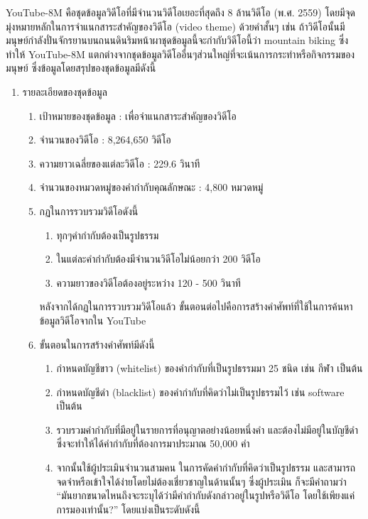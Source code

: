 YouTube-8M คือชุดข้อมูลวิดีโอที่มีจำนวนวิดีโอเยอะที่สุดถึง 8 ล้านวิดีโอ (พ.ศ. 2559) โดยมีจุดมุ่งหมายหลักในการจำแนกสาระสำคัญของวิดีโอ (video theme) 
ด้วยคำสั้นๆ เช่น ถ้าวิดีโอนั้นมีมนุษย์กำลังปั่นจักรยานบนถนนดินริมหน้าผาชุดข้อมูลนี้จะกำกับวิดีโอนี้ว่า mountain biking ซึ่งทำให้ YouTube-8M 
แตกต่างจากชุดข้อมูลวิดีโออื่นๆส่วนใหญ่ที่จะเน้นการกระทำหรือกิจกรรมของมนุษย์ ซึ่งข้อมูลโดยสรุปของชุดข้อมูลมีดังนี้
\begin{enumerate}
	\item {รายละเอียดของชุดข้อมูล}
	\begin{enumerate}
		\setlength\itemsep{-0.25em}
		\item เป้าหมายของชุดข้อมูล : เพื่อจำแนกสาระสำคัญของวิดีโอ
		\item จำนวนของวิดีโอ : 8,264,650 วิดีโอ
		\item ความยาวเฉลี่ยของแต่ละวิดีโอ : 229.6 วินาที
		\item จำนวนของหมวดหมู่ของคำกำกับคุณลักษณะ : 4,800 หมวดหมู่
		\item กฏในการรวบรวมวิดีโอดังนี้
		\begin{enumerate}
			\setlength\itemsep{-0.25em}
			\item ทุกๆคำกำกับต้องเป็นรูปธรรม
			\item ในแต่ละคำกำกับต้องมีจำนวนวิดีโอไม่น้อยกว่า 200 วิดีโอ
			\item ความยาวของวิดีโอต้องอยู่ระหว่าง 120 - 500 วินาที
		\end{enumerate}
		หลังจากได้กฏในการรวบรวมวิดีโอแล้ว ขั้นตอนต่อไปคือการสร้างคำศัพท์ที่ใช้ในการค้นหาข้อมูลวิดีโอจากใน YouTube 
		\item ขั้นตอนในการสร้างคำศัพท์มีดังนี้
		\begin{enumerate}
			\setlength\itemsep{-0.25em}
			\item กำหนดบัญชีขาว (whitelist) ของคำกำกับที่เป็นรูปธรรมมา 25 ชนิด เช่น กีฬา เป็นต้น
			\item กำหนดบัญชีดำ (blacklist) ของคำกำกับที่คิดว่าไม่เป็นรูปธรรมไว้ เช่น software เป็นต้น
			\item รวบรวมคำกำกับที่มีอยู่ในรายการที่อนุญาตอย่างน้อยหนึ่งคำ และต้องไม่มีอยู่ในบัญชีดำ ซึ่งจะทำให้ได้คำกำกับที่ต้องการมาประมาณ 50,000 คำ
			\item จากนั้นใช้ผู้ประเมินจำนวนสามคน ในการคัดคำกำกับที่คิดว่าเป็นรูปธรรม และสามารถจดจำหรือเข้าใจได้ง่ายโดยไม่ต้องเชี่ยวชาญในด้านนั้นๆ 
			ซึ่งผู้ประเมิน ก็จะมีคำถามว่า “มันยากขนาดไหนถึงจะระบุได้ว่ามีคำกำกับดังกล่าวอยู่ในรูปหรือวิดีโอ โดยใช้เพียงแค่การมองเท่านั้น?” โดยแบ่งเป็นระดับดังนี้
			\begin{enumerate}

\end{enumerate}
\end{enumerate}
\end{enumerate}
\end{enumerate}
